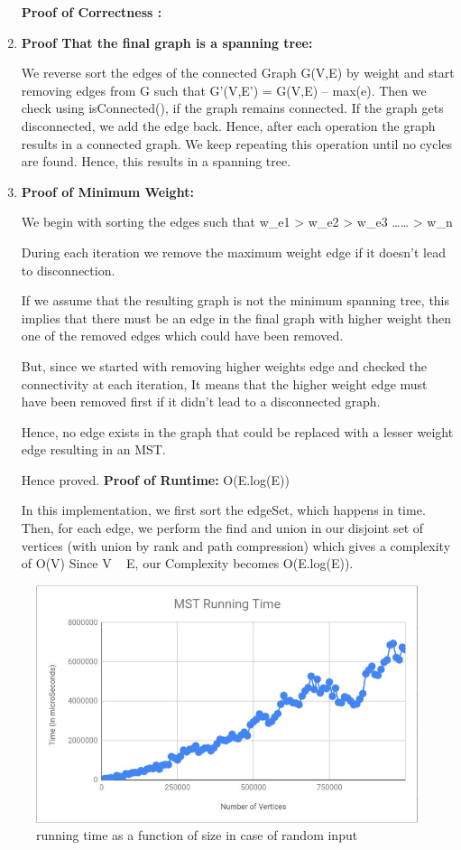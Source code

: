 \documentclass[12pt,letterpaper]{article}
\begin{document}
\begin{enumerate}

\linebreak
\textbf{Proof of Correctness :}\newline

\item
\textbf{Proof That the final graph is a spanning tree:}

We reverse sort the edges of the connected Graph G(V,E) by weight and start removing edges from G such that G’(V,E’) = G(V,E) – max(e). Then we check using isConnected(), if the graph remains connected. If the graph gets disconnected, we add the edge back. Hence, after each operation the graph results in a connected graph. We keep repeating this operation until no cycles are found. Hence, this results in a spanning tree. \hfill \hfill
\newpage

\item
\textbf{Proof of Minimum Weight:}

We begin with sorting the edges such that
w_{e1} > w_{e2} > w_{e3} …… > w_{n}

During each iteration we remove the maximum weight edge if it doesn't lead to disconnection.

If we assume that the resulting graph is not the minimum spanning tree, this implies that there must be an edge in the final graph with higher weight then one of the removed edges which could have been removed.

But, since we started with removing higher weights edge and checked the connectivity at each iteration, It means that the higher weight edge must have been removed first if it didn't lead to a disconnected graph.  

Hence, no edge exists in the graph that could be replaced with a lesser weight edge resulting in an MST. 

Hence proved.
\newline\newline
\textbf{Proof of Runtime:} O(E.log(E))\newline

In this implementation, we first sort the edgeSet, which happens in  time. Then, for each edge, we perform the find and union in our disjoint set of vertices (with union by rank and path compression) which gives a complexity of O(V) Since V ~ E, our Complexity becomes O(E.log(E)). 


\end{enumerate}
\begin{figure}[!h]
\centering
\includegraphics[width=0.5\linewidth]{mst.JPG}
\caption{running time as a function of size in case of random input}
\end{figure}
\end{document}
